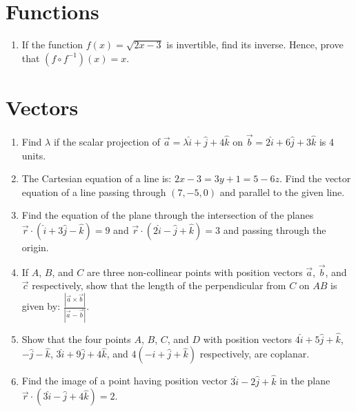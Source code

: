 \documentclass[a4paper,12pt]{article}
\begin{document}
\section{Functions}


\begin{enumerate}

		\item

    If the function $f(x) = \sqrt{2x - 3}$ is invertible, find its inverse. Hence, prove that $(f \circ f^{-1})(x) = x$.

\end{enumerate}


\section{Vectors}

\begin{enumerate}
		

\item Find $\lambda$ if the scalar projection of $\vec{a} = \lambda \hat{i} + \hat{j} + 4\hat{k}$ on $\vec{b} = 2\hat{i} + 6\hat{j} + 3\hat{k}$ is 4 units.
        \item The Cartesian equation of a line is: $2x - 3 = 3y + 1 = 5 - 6z$. Find the vector equation of a line passing through $(7, -5, 0)$ and parallel to the given line.
        \item Find the equation of the plane through the intersection of the planes $\vec{r} \cdot (\hat{i} + 3\hat{j} - \hat{k}) = 9$ and $\vec{r} \cdot (2\hat{i} - \hat{j} + \hat{k}) = 3$ and passing through the origin.
    
        \item If $A$, $B$, and $C$ are three non-collinear points with position vectors $\vec{a}$, $\vec{b}$, and$\vec{c}$ respectively, show that the length of the perpendicular from $C$ on $AB$ is given by:
        $ \frac{|\vec{a} \times \vec{b}|}{|\vec{a} - \vec{b}|}. $
        \item Show that the four points $A$, $B$, $C$, and $D$ with position vectors $4\hat{i} + 5\hat{j} + \hat{k}$, $-\hat{j} - \hat{k}$, $3\hat{i} + 9\hat{j} + 4\hat{k}$, and $4(-\hat{i} + \hat{j} + \hat{k})$ respectively, are coplanar.
    

	\item Find the image of a point having position vector $3\hat{i} - 2\hat{j} + \hat{k}$ in the plane $\vec{r} \cdot (3\hat{i} - \hat{j} + 4\hat{k}) = 2$.

\end{enumerate}
\end{document}
